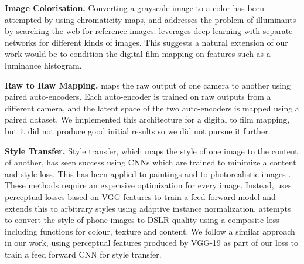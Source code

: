 \noindent\textbf{Image Colorisation.} Converting a grayscale image to a color has been attempted by \cite{large-scale-colorisation} using chromaticity maps, and \cite{intrinsic-colorisation} addresses the problem of illuminants by searching the web for reference images. \cite{deep-colorisation} leverages deep learning with separate networks for different kinds of images. This suggests a natural extension of our work would be to condition the digital-film mapping on features such as a luminance histogram.

\noindent\textbf{Raw to Raw Mapping.} \cite{raw-to-raw} maps the raw output of one camera to another using paired auto-encoders. Each auto-encoder is trained on raw outputs from a different camera, and the latent space of the two auto-encoders is mapped using a paired dataset. We implemented this architecture for a digital to film mapping, but it did not produce good initial results so we did not pursue it further.

\noindent\textbf{Style Transfer.} Style transfer, which maps the style of one image to the content of another, has seen success using CNNs which are trained to minimize a content and style loss. This has been applied to paintings \cite{image-style-transfer, scaling-painting-style-transfer} and to photorealistic images \cite{deep-photo-style-transfer}. These methods require an expensive optimization for every image. Instead, \cite{resolution-perceptual-losses} uses perceptual losses based on VGG features to train a feed forward model and \cite{arbitrary-style-transfer} extends this to arbitrary styles using adaptive instance normalization. \cite{dslr-quality} attempts to convert the style of phone images to DSLR quality using a composite loss including functions for colour, texture and content. We follow a similar approach in our work, using perceptual features produced by VGG-19 \cite{vgg} as part of our loss to train a feed forward CNN for style transfer.




